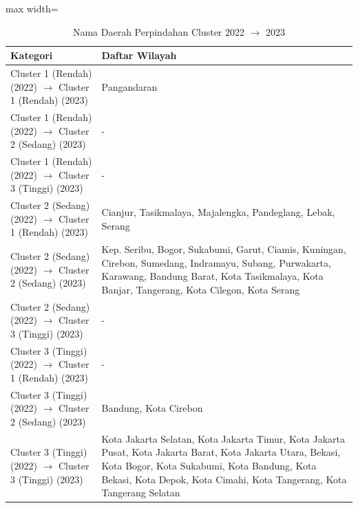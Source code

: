 \begin{table}[H]
\centering
\caption{Nama Daerah Perpindahan Cluster 2022 \(\rightarrow\) 2023} \label{tab:apptransname2022x2023}
\begin{adjustbox}{max width=\textwidth}
\begin{tabular}{|p{4cm}|p{10cm}|}
\hline
\textbf{Kategori} & \textbf{Daftar Wilayah} \\
\hline
Cluster 1 (Rendah) (2022) \(\rightarrow\) Cluster 1 (Rendah) (2023) & Pangandaran \\
\hline
Cluster 1 (Rendah) (2022) \(\rightarrow\) Cluster 2 (Sedang) (2023) & - \\
\hline
Cluster 1 (Rendah) (2022) \(\rightarrow\) Cluster 3 (Tinggi) (2023) & - \\
\hline
Cluster 2 (Sedang) (2022) \(\rightarrow\) Cluster 1 (Rendah) (2023) & Cianjur, Tasikmalaya, Majalengka, Pandeglang, Lebak, Serang \\
\hline
Cluster 2 (Sedang) (2022) \(\rightarrow\) Cluster 2 (Sedang) (2023) & Kep. Seribu, Bogor, Sukabumi, Garut, Ciamis, Kuningan, Cirebon, Sumedang, Indramayu, Subang, Purwakarta, Karawang, Bandung Barat, Kota Tasikmalaya, Kota Banjar, Tangerang, Kota Cilegon, Kota Serang \\
\hline
Cluster 2 (Sedang) (2022) \(\rightarrow\) Cluster 3 (Tinggi) (2023) & - \\
\hline
Cluster 3 (Tinggi) (2022) \(\rightarrow\) Cluster 1 (Rendah) (2023) & - \\
\hline
Cluster 3 (Tinggi) (2022) \(\rightarrow\) Cluster 2 (Sedang) (2023) & Bandung, Kota Cirebon \\
\hline
Cluster 3 (Tinggi) (2022) \(\rightarrow\) Cluster 3 (Tinggi) (2023) & Kota Jakarta Selatan, Kota Jakarta Timur, Kota Jakarta Pusat, Kota Jakarta Barat, Kota Jakarta Utara, Bekasi, Kota Bogor, Kota Sukabumi, Kota Bandung, Kota Bekasi, Kota Depok, Kota Cimahi, Kota Tangerang, Kota Tangerang Selatan \\
\hline
\end{tabular}
\end{adjustbox}
\end{table}